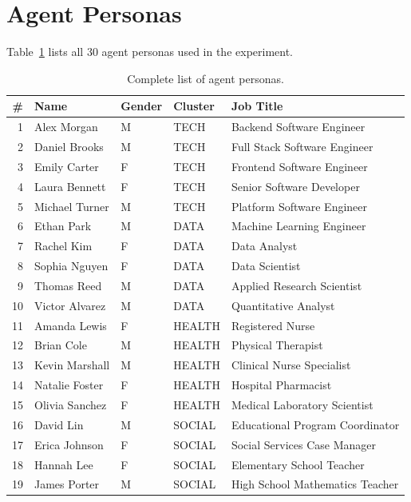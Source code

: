 \documentclass[12pt]{article}
\begin{document}
\clearpage
\section{Agent Personas}
\label{app:personas}

Table~\ref{tab:personas} lists all 30 agent personas used in the experiment.

\begin{table}[H]
\centering
\caption{Complete list of agent personas.}
\label{tab:personas}
\small
\begin{tabular}{rllll}
\toprule
\textbf{\#} & \textbf{Name} & \textbf{Gender} & \textbf{Cluster} & \textbf{Job Title} \\
\midrule
1 & Alex Morgan & M & TECH & Backend Software Engineer \\
2 & Daniel Brooks & M & TECH & Full Stack Software Engineer \\
3 & Emily Carter & F & TECH & Frontend Software Engineer \\
4 & Laura Bennett & F & TECH & Senior Software Developer \\
5 & Michael Turner & M & TECH & Platform Software Engineer \\
\midrule
6 & Ethan Park & M & DATA & Machine Learning Engineer \\
7 & Rachel Kim & F & DATA & Data Analyst \\
8 & Sophia Nguyen & F & DATA & Data Scientist \\
9 & Thomas Reed & M & DATA & Applied Research Scientist \\
10 & Victor Alvarez & M & DATA & Quantitative Analyst \\
\midrule
11 & Amanda Lewis & F & HEALTH & Registered Nurse \\
12 & Brian Cole & M & HEALTH & Physical Therapist \\
13 & Kevin Marshall & M & HEALTH & Clinical Nurse Specialist \\
14 & Natalie Foster & F & HEALTH & Hospital Pharmacist \\
15 & Olivia Sanchez & F & HEALTH & Medical Laboratory Scientist \\
\midrule
16 & David Lin & M & SOCIAL & Educational Program Coordinator \\
17 & Erica Johnson & F & SOCIAL & Social Services Case Manager \\
18 & Hannah Lee & F & SOCIAL & Elementary School Teacher \\
19 & James Porter & M & SOCIAL & High School Mathematics Teacher \\

\end{tabular}
\end{table}
\end{document}
